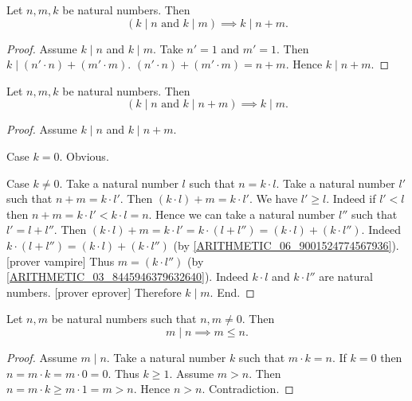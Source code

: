 \documentclass[10pt]{article}
\begin{document}
  \begin{forthel}
    \begin{corollary}
      Let $n, m, k$ be natural numbers.
      Then \[ (\text{$k \mid n$ and $k \mid m$}) \implies k \mid n + m. \]
    \end{corollary}
    \begin{proof}
      Assume $k \mid n$ and $k \mid m$.
      Take $n' = 1$ and $m' = 1$.
      Then $k \mid (n' \cdot n) + (m' \cdot m)$.
      $(n' \cdot n) + (m' \cdot m) = n + m$.
      Hence $k \mid n + m$.
    \end{proof}
  \end{forthel}

  \begin{forthel}
    \begin{proposition}
      Let $n, m, k$ be natural numbers.
      Then \[ (\text{$k \mid n$ and $k \mid n + m$}) \implies k \mid m. \]
    \end{proposition}
    \begin{proof}
      Assume $k \mid n$ and $k \mid n + m$.

      Case $k = 0$. Obvious.

      Case $k \neq 0$.
        Take a natural number $l$ such that $n = k \cdot l$.
        Take a natural number $l'$ such that $n + m = k \cdot l'$.
        Then $(k \cdot l) + m = k \cdot l'$.
        We have $l' \geq l$.
        Indeed if $l' < l$ then
        $n + m
          = k \cdot l'
          < k \cdot l
          = n$.
        Hence we can take a natural number $l''$ such that $l' = l + l''$.
        Then $(k \cdot l) + m
          = k \cdot l'
          = k \cdot (l + l'')
          = (k \cdot l) + (k \cdot l'')$.
        Indeed $k \cdot (l + l'') = (k \cdot l) + (k \cdot l'')$
        (by \cref{ARITHMETIC_06_9001524774567936}).
        [prover vampire]
        Thus $m = (k \cdot l'')$ (by \cref{ARITHMETIC_03_8445946379632640}).
        Indeed $k \cdot l$ and $k \cdot l''$ are natural numbers.
        [prover eprover]
        Therefore $k \mid m$.
      End.
    \end{proof}
  \end{forthel}

  \begin{forthel}
    \begin{proposition}
      Let $n, m$ be natural numbers such that $n, m \neq 0$.
      Then \[ m \mid n \implies m \leq n. \]
    \end{proposition}
    \begin{proof}
      Assume $m \mid n$.
      Take a natural number $k$ such that $m \cdot k = n$.
      If $k = 0$ then
      $n
        = m \cdot k
        = m \cdot 0
        = 0$.
      Thus $k \geq 1$.
      Assume $m > n$.
      Then $n
        = m \cdot k
        \geq m \cdot 1
        = m
        > n$.
      Hence $n > n$.
      Contradiction.
    \end{proof}
  \end{forthel}
\end{document}
